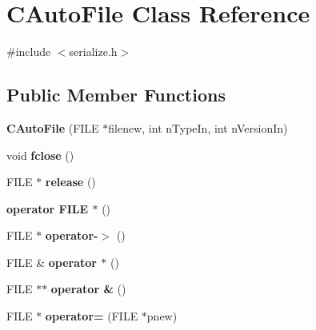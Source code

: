 \hypertarget{class_c_auto_file}{}\section{C\+Auto\+File Class Reference}
\label{class_c_auto_file}


{\ttfamily \#include $<$serialize.\+h$>$}

\subsection*{Public Member Functions}
\begin{DoxyCompactItemize}
\item 
\mbox{\label{class_c_auto_file_a52613083aaeab4c9238c649ae471783f}} 
{\bfseries C\+Auto\+File} (F\+I\+LE $\ast$filenew, int n\+Type\+In, int n\+Version\+In)
\item 
\mbox{\label{class_c_auto_file_abcbafe943bfe392c09363078fa8a4e77}} 
void {\bfseries fclose} ()
\item 
\mbox{\label{class_c_auto_file_a25b51d94dc85c4140da0b15494ac9f8a}} 
F\+I\+LE $\ast$ {\bfseries release} ()
\item 
\mbox{\label{class_c_auto_file_a903d7058c4cd92d3c13b0d62dfaee3f4}} 
{\bfseries operator F\+I\+L\+E $\ast$} ()
\item 
\mbox{\label{class_c_auto_file_aef9213ad71294fc518e092771bf6ec46}} 
F\+I\+LE $\ast$ {\bfseries operator-\/$>$} ()
\item 
\mbox{\label{class_c_auto_file_a0ffe47cf39b0373b171a3bfa1fb7d2de}} 
F\+I\+LE \& {\bfseries operator $\ast$} ()
\item 
\mbox{\label{class_c_auto_file_a8a8282fb6ef7e34ae7338f7e482aa251}} 
F\+I\+LE $\ast$$\ast$ {\bfseries operator \&} ()
\item 
\mbox{\label{class_c_auto_file_a1ceb9211a21bea5885204b8e05d2e422}} 
F\+I\+LE $\ast$ {\bfseries operator=} (F\+I\+LE $\ast$pnew)
\item 
\mbox{\label{class_c_auto_file_a39e0a0cc31794200679b5db04c400ef9}} 
$$
\end{DoxyCompactItemize}
